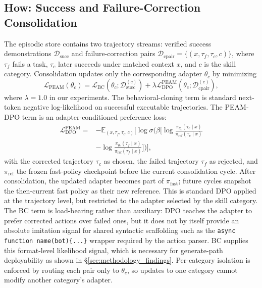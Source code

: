 \documentclass[11pt]{article}
\begin{document}
\subsection{How: Success and Failure-Correction Consolidation}
The episodic store contains two trajectory streams: verified success demonstrations $\mathcal{D}_{\text{succ}}$ and failure-correction pairs $\mathcal{D}_{\text{cpair}}=\{(x,\tau_f,\tau_c,c)\}$, where $\tau_f$ fails a task, $\tau_c$ later succeeds under matched context $x$, and $c$ is the skill category. Consolidation updates only the corresponding adapter $\theta_c$ by minimizing
\begin{equation}
\mathcal{L}_{\text{PEAM}}(\theta_c)
=
\mathcal{L}_{\text{BC}}(\theta_c;\mathcal{D}^{(c)}_{\text{succ}})
+
\lambda \mathcal{L}_{\text{DPO}}^{\text{PEAM}}(\theta_c;\mathcal{D}^{(c)}_{\text{cpair}}),
\label{eq:peam_loss}
\end{equation}
where $\lambda=1.0$ in our experiments. The behavioral-cloning term is standard next-token negative log-likelihood on successful executable trajectories. The PEAM-DPO term is an adapter-conditioned preference loss:
\begin{equation}
\begin{aligned}
\mathcal{L}_{\text{DPO}}^{\text{PEAM}} = &
-\mathbb{E}_{(x,\tau_f,\tau_c,c)} \bigg[ \log \sigma \bigg( \beta \Big[ \log \frac{\pi_{\theta_c}(\tau_c \mid x)}{\pi_{\text{ref}}(\tau_c \mid x)} \\
& - \log \frac{\pi_{\theta_c}(\tau_f \mid x)}{\pi_{\text{ref}}(\tau_f \mid x)} \Big] \bigg) \bigg],
\end{aligned}
\label{eq:peam_dpo}
\end{equation}
with the corrected trajectory $\tau_c$ as chosen, the failed trajectory $\tau_f$ as rejected, and $\pi_{\text{ref}}$ the frozen fast-policy checkpoint before the current consolidation cycle. After consolidation, the updated adapter becomes part of $\pi_{\text{fast}}$; future cycles snapshot the then-current fast policy as their new reference. This is standard DPO applied at the trajectory level, but restricted to the adapter selected by the skill category. The BC term is load-bearing rather than auxiliary: DPO teaches the adapter to prefer corrected actions over failed ones, but it does not by itself provide an absolute imitation signal for shared syntactic scaffolding such as the \texttt{async function name(bot)\{...\}} wrapper required by the action parser. BC supplies this format-level likelihood signal, which is necessary for generate-path deployability as shown in \S\ref{sec:methodology_findings}. Per-category isolation is enforced by routing each pair only to $\theta_c$, so updates to one category cannot modify another category's adapter.
\end{document}
